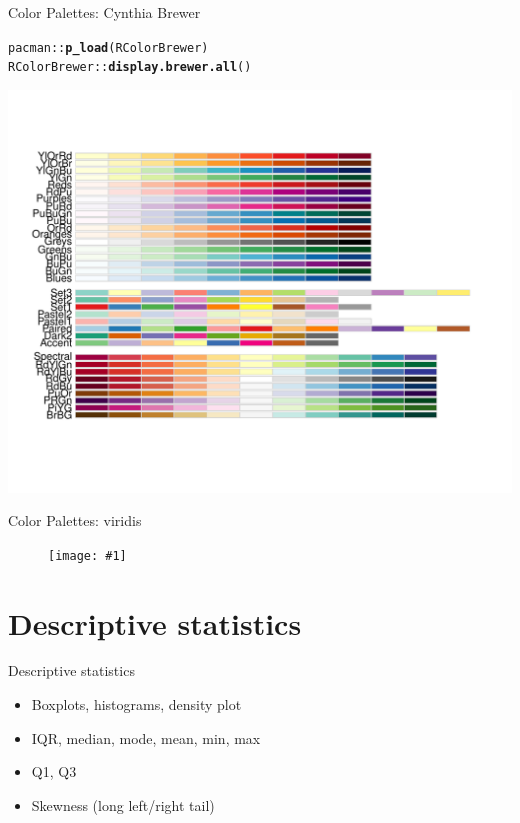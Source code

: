 \documentclass{beamer}\usepackage[]{graphicx}\usepackage[]{color}
\newcommand{\hlopt}[1]{\textcolor[rgb]{0,0,0}{#1}}%
\newcommand{\hlstd}[1]{\textcolor[rgb]{0.345,0.345,0.345}{#1}}%
\newcommand{\hlkwd}[1]{\textcolor[rgb]{0.737,0.353,0.396}{\textbf{#1}}}%
\newenvironment{knitrout}{}{} %
\newcommand {\framedgraphic}[1] {
	\begin{figure}
		\centering
		\texttt{[image: \#1]}
	\end{figure}
}
\begin{document}
\begin{frame}[fragile]{Color Palettes: Cynthia Brewer}

\begin{knitrout}\scriptsize
{}\color{fgcolor}
\begin{alltt}
\hlstd{pacman}\hlopt{::}\hlkwd{p_load}\hlstd{(RColorBrewer)}
\hlstd{RColorBrewer}\hlopt{::}\hlkwd{display.brewer.all}\hlstd{()}
\end{alltt}


{\centering \includegraphics[width=1\linewidth]{figure/unnamed-chunk-1-1} 

}



\end{knitrout}


\end{frame}



\begin{frame}[fragile]{Color Palettes: viridis}



\framedgraphic{viridis.png}


\end{frame}



\section{Descriptive statistics}


\begin{frame}{Descriptive statistics}
\begin{itemize}
	\setlength\itemsep{1.5em}
	\item Boxplots, histograms, density plot
	\item IQR, median, mode, mean, min, max
	\item Q1, Q3
	\item Skewness (long left/right tail)
\end{itemize}
\end{frame}
\end{document}
